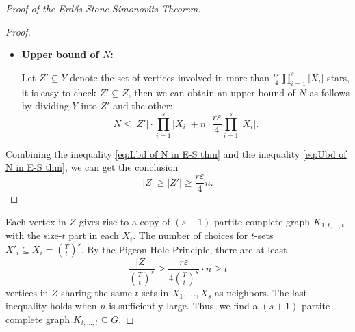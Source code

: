 \documentclass{article}
\theoremstyle{definition}
\def\Erdos{Erd\H{o}s}
\begin{document}
\begin{proof}[Proof of the \Erdos{}-Stone-Simonovits Theorem]
\begin{proof}
\begin{itemize}
            Fix an $s$-tuple $(x_1,\cdots,x_s)\in X_1\times X_2\times\cdots\times X_s$, then for sufficiently large $n$, we have
            \begin{align*}
                &\#\{\text{Common neighbors of $x_i$}\}\\
                \geq&\sum_{i=1}^{s}d(x_{i})-(s-1)n-sT\\
                \geq&(1-\frac{1}{r}+\varepsilon)ns-(s-1)n-s\frac{4}{r\varepsilon} t\\
                =&n-(n(\frac{1}{r}-\varepsilon)+\frac{4}{r\varepsilon}t)s\\
                \geq&nr\varepsilon-\frac{4}{\varepsilon} t\\
                \geq&\frac{nr\varepsilon}{2},
            \end{align*}
            where the first inequality is obtained by considering the limiting case that all vertices in $Y$ is common neighbors of $s$ or $s-1$ vertices in $\{x_1,\cdots,x_s\}$. By counting all possible values of $s$-tuple, we obtain a lower bound of $N$:
            \begin{equation}\label{eq:Lbd of N in E-S thm}
                N\geq\prod_{i=1}^{s}|X_{i}|\cdot\#\{\text{Common neighbors of $x_i$}\}\geq\prod_{i=1}^{s}|X_{i}|\cdot \frac{nr\varepsilon}{2}.
            \end{equation}

            \item \textbf{Upper bound of $N$:}

            Let $Z'\subseteq Y$ denote the set of vertices involved in more than $\frac{r\varepsilon}{4}\prod_{i=1}^{s}|X_{i}|$ stars, it is easy to check $Z'\subseteq Z$, then we can obtain an upper bound of $N$ as follows by dividing $Y$ into $Z'$ and the other:
            \begin{equation}\label{eq:Ubd of N in E-S thm}
                N\leq |Z'|\cdot\prod_{i=1}^{s}|X_i|+n\cdot\frac{r\varepsilon}{4}\prod_{i=1}^{s}|X_i|.
            \end{equation}
        \end{itemize}
        Combining the inequality \eqref{eq:Lbd of N in E-S thm} and the inequality \eqref{eq:Ubd of N in E-S thm}, we can get the conclusion
        \[
        |Z|\geq|Z'|\geq\frac{r\varepsilon}{4}n.
        \]
    \end{proof}
    
    Each vertex in $Z$ gives rise to a copy of $(s+1)$-partite complete graph $K_{1,t,...,t}$ with the size-$t$ part in each $X_i$. The number of choices for $t$-sets $X'_i \subseteq X_i = \binom{T}{t}^s$. By the Pigeon Hole Principle, there are at least
    \[
    \frac{|Z|}{\binom{T}{t}^s} \geq \frac{r\varepsilon}{4 \binom{T}{t}^s} \cdot n \geq t
    \]
    vertices in $Z$ sharing the same $t$-sets in $X_1,...,X_s$ as neighbors. The last inequality holds when $n$ is sufficiently large. Thus, we find a $(s+1)$-partite complete graph $K_{t,...,t} \subseteq G$. 
\end{proof}
\end{document}
